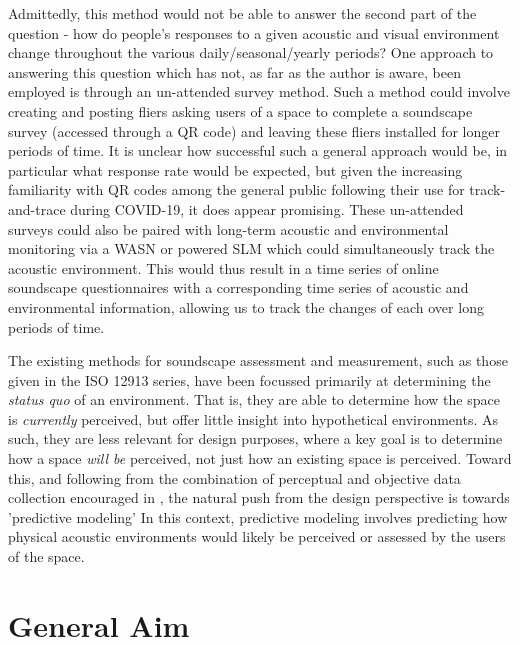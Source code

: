 Admittedly, this method would not be able to answer the second part of the question - how do people's responses to a given acoustic and visual environment change throughout the various daily/seasonal/yearly periods? One approach to answering this question which has not, as far as the author is aware, been employed is through an un-attended survey method. Such a method could involve creating and posting fliers asking users of a space to complete a soundscape survey (accessed through a QR code) and leaving these fliers installed for longer periods of time. It is unclear how successful such a general approach would be, in particular what response rate would be expected, but given the increasing familiarity with QR codes among the general public following their use for track-and-trace during COVID-19, it does appear promising. These un-attended surveys could also be paired with long-term acoustic and environmental monitoring via a WASN or powered SLM which could simultaneously track the acoustic environment. This would thus result in a time series of online soundscape questionnaires with a corresponding time series of acoustic and environmental information, allowing us to track the changes of each over long periods of time.



The existing methods for soundscape assessment and measurement, such as those given in the ISO 12913 series, have been focussed primarily at determining the \emph{status quo} of an environment. That is, they are able to determine how the space is \emph{currently} perceived, but offer little insight into hypothetical environments. As such, they are less relevant for design purposes, where a key goal is to determine how a space \emph{will be} perceived, not just how an existing space is perceived. Toward this, and following from the combination of perceptual and objective data collection encouraged in \citet{ISO12913_2_2018IOS}, the natural push from the design perspective is towards 'predictive modeling' In this context, predictive modeling involves predicting how physical acoustic environments would likely be perceived or assessed by the users of the space.




\section{General Aim}
